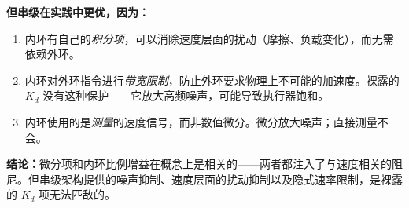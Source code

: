 \textbf{但串级在实践中更优，因为：}
\begin{enumerate}[nosep]
    \item 内环有自己的\textit{积分项}，可以消除速度层面的扰动（摩擦、负载变化），而无需依赖外环。
    \item 内环对外环指令进行\textit{带宽限制}，防止外环要求物理上不可能的加速度。裸露的 $K_d$ 没有这种保护——它放大高频噪声，可能导致执行器饱和。
    \item 内环使用的是\textit{测量}的速度信号，而非数值微分。微分放大噪声；直接测量不会。
\end{enumerate}

\textbf{结论：}微分项和内环比例增益在概念上是相关的——两者都注入了与速度相关的阻尼。但串级架构提供的噪声抑制、速度层面的扰动抑制以及隐式速率限制，是裸露的 $K_d$ 项无法匹敌的。
